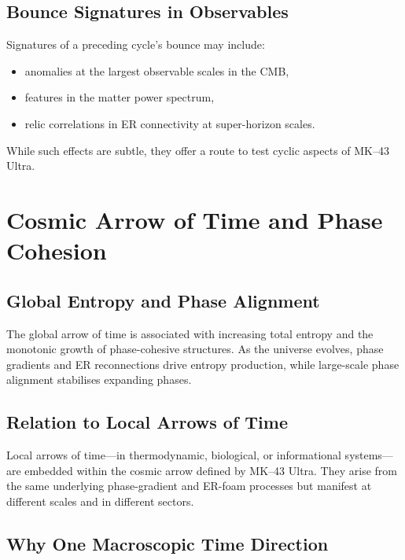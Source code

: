 \section{Bounce Signatures in Observables}

Signatures of a preceding cycle's bounce may include:
\begin{itemize}
  \item anomalies at the largest observable scales in the CMB,
  \item features in the matter power spectrum,
  \item relic correlations in ER connectivity at super-horizon scales.
\end{itemize}
While such effects are subtle, they offer a route to test cyclic aspects of MK--43 Ultra.


\chapter{Cosmic Arrow of Time and Phase Cohesion}

\section{Global Entropy and Phase Alignment}

The global arrow of time is associated with increasing total entropy and the monotonic growth of phase-cohesive structures.
As the universe evolves, phase gradients and ER reconnections drive entropy production, while large-scale phase alignment stabilises expanding phases.

\section{Relation to Local Arrows of Time}

Local arrows of time---in thermodynamic, biological, or informational systems---are embedded within the cosmic arrow defined by MK--43 Ultra.
They arise from the same underlying phase-gradient and ER-foam processes but manifest at different scales and in different sectors.

\section{Why One Macroscopic Time Direction}


